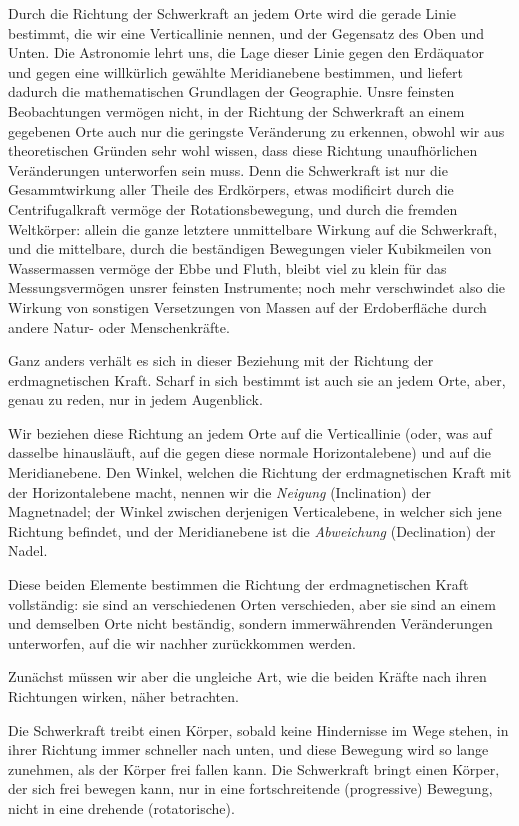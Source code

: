 \documentclass[12pt,a4paper]{article}
\begin{document}
\bigskip

Durch die Richtung der Schwerkraft an jedem Orte wird die gerade Linie bestimmt, die wir eine Verticallinie nennen, und der Gegensatz des Oben und Unten. Die Astronomie lehrt uns, die Lage dieser Linie gegen den Erdäquator und gegen eine willkürlich gewählte Meridianebene bestimmen, und liefert dadurch die mathematischen Grundlagen der Geographie. Unsre feinsten Beobachtungen vermögen nicht, in der Richtung der Schwerkraft an einem gegebenen Orte auch nur die geringste Veränderung zu erkennen, obwohl wir aus theoretischen Gründen sehr wohl wissen, dass diese Richtung unaufhörlichen Veränderungen unterworfen sein muss. Denn die Schwerkraft ist nur die Gesammtwirkung aller Theile des Erdkörpers, etwas modificirt durch die Centrifugalkraft vermöge der Rotationsbewegung, und durch die fremden Weltkörper: allein die ganze letztere unmittelbare Wirkung auf die Schwerkraft, und die mittelbare, durch die beständigen Bewegungen vieler Kubikmeilen von Wassermassen vermöge der Ebbe und Fluth, bleibt viel zu klein für das Messungsvermögen unsrer feinsten Instrumente; noch mehr verschwindet also die Wirkung von sonstigen Versetzungen von Massen auf der Erdoberfläche durch andere Natur- oder Menschenkräfte.

Ganz anders verhält es sich in dieser Beziehung mit der Richtung der erdmagnetischen Kraft. Scharf in sich bestimmt ist auch sie an jedem Orte, aber, genau zu reden, nur in jedem Augenblick.

Wir beziehen diese Richtung an jedem Orte auf die Verticallinie (oder, was auf dasselbe hinausläuft, auf die gegen diese normale Horizontalebene) und auf die Meridianebene. Den Winkel, welchen die Richtung der erdmagnetischen Kraft mit der Horizontalebene macht, nennen wir die \textit{Neigung} (Inclination) der Magnetnadel; der Winkel zwischen derjenigen Verticalebene, in welcher sich jene Richtung befindet, und der Meridianebene ist die \textit{Abweichung} (Declination) der Nadel.

Diese beiden Elemente bestimmen die Richtung der erdmagnetischen Kraft vollständig: sie sind an verschiedenen Orten verschieden, aber sie sind an einem und demselben Orte nicht beständig, sondern immerwährenden Veränderungen unterworfen, auf die wir nachher zurückkommen werden.

Zunächst müssen wir aber die ungleiche Art, wie die beiden Kräfte nach ihren Richtungen wirken, näher betrachten.

\bigskip

Die Schwerkraft treibt einen Körper, sobald keine Hindernisse im Wege stehen, in ihrer Richtung immer schneller nach unten, und diese Bewegung wird so lange zunehmen, als der Körper frei fallen kann. Die Schwerkraft bringt einen Körper, der sich frei bewegen kann, nur in eine fortschreitende (progressive) Bewegung, nicht in eine drehende (rotatorische).
\end{document}
